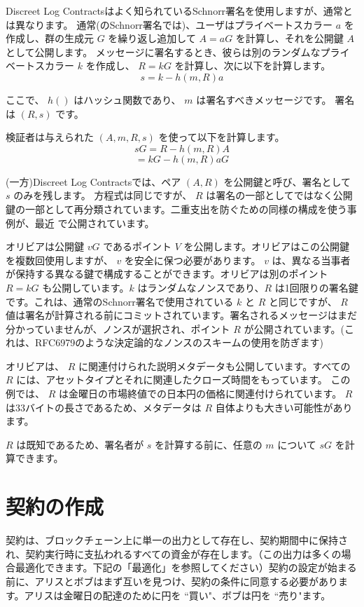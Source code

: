 \documentclass[11pt]{article}
\begin{document}
Discreet Log Contractsはよく知られているSchnorr署名\cite{schnorr1990efficient}を使用しますが、通常とは異なります。 通常(のSchnorr署名では)、ユーザはプライベートスカラー \(a\) を作成し、群の生成元 \(G\) を繰り返し追加して \(A = aG\) を計算し、それを公開鍵 \(A\) として公開します。 メッセージに署名するとき、彼らは別のランダムなプライベートスカラー \(k\) を作成し、 \(R = kG\) を計算し、次に以下を計算します。  \[s = k - h(m, R)a\]

ここで、 \(h()\) はハッシュ関数であり、 \(m\) は署名すべきメッセージです。 署名は \((R, s)\) です。 

検証者は与えられた \((A, m, R, s)\) を使って以下を計算します。
\[sG = R - h(m, R)A\]
\[= kG - h(m, R)aG\]

(一方)Discreet Log Contractsでは、ペア \((A, R)\) を公開鍵と呼び、署名として \(s\) のみを残します。 方程式は同じですが、 \(R\) は署名の一部としてではなく公開鍵の一部として再分類されています。二重支出を防ぐための同様の構成を使う事例が、最近 \cite{cryptoeprint:2017:394}で公開されています。

オリビアは公開鍵 \(vG\) であるポイント \(V\) を公開します。オリビアはこの公開鍵を複数回使用しますが、 \(v\) を安全に保つ必要があります。 \(v\) は、異なる当事者が保持する異なる鍵で構成することができます。オリビアは別のポイント  \(R = kG\) も公開しています。\(k\) はランダムなノンスであり、\(R\) は1回限りの署名鍵です。これは、通常のSchnorr署名で使用されている \(k\) と \(R\) と同じですが、 \(R\) 値は署名が計算される前にコミットされています。署名されるメッセージはまだ分かっていませんが、ノンスが選択され、ポイント  \(R\) が公開されています。(これは、RFC6979のような決定論的なノンスのスキームの使用を防ぎます)

オリビアは、 \(R\) に関連付けられた説明メタデータも公開しています。すべての \(R\) には、アセットタイプとそれに関連したクローズ時間をもっています。 この例では、 \(R\) は金曜日の市場終値での日本円の価格に関連付けられています。  \(R\) は33バイトの長さであるため、メタデータは \(R\) 自体よりも大きい可能性があります。

 \(R\) は既知であるため、署名者が \(s\) を計算する前に、任意の \(m\) について \(sG\) を計算できます。

\section*{契約の作成}


契約は、ブロックチェーン上に単一の出力として存在し、契約期間中に保持され、契約実行時に支払われるすべての資金が存在します。（この出力は多くの場合最適化できます。下記の「最適化」を参照してください）契約の設定が始まる前に、アリスとボブはまず互いを見つけ、契約の条件に同意する必要があります。アリスは金曜日の配達のために円を ``買い"、ボブは円を ``売り"ます。
\end{document}

